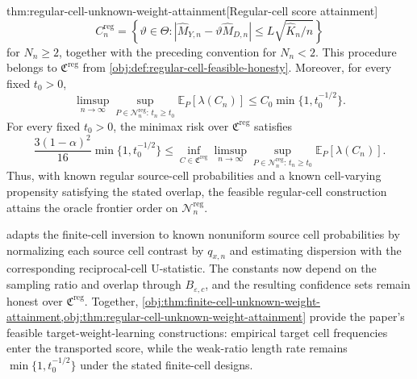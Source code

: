 \begin{theoremv}{thm:regular-cell-unknown-weight-attainment}[Regular-cell score attainment]
\[
C_n^{\mathrm{reg}}
=
\left\{\vartheta\in\Theta:
|\widehat M_{Y,n}-\vartheta\widehat M_{D,n}|
\le L\sqrt{\widehat K_n/n}\right\}
\]
for \(N_n\ge2\), together with the preceding convention for \(N_n<2\).  This procedure belongs to \(\mathfrak C^{\mathrm{reg}}\) from \cref{obj:def:regular-cell-feasible-honesty}.  Moreover, for every fixed \(t_0>0\),
\[
\limsup_{n\to\infty}\sup_{P\in\mathcal N_n^{\mathrm{reg}}:\,t_n\ge t_0}
\mathbb E_P[\lambda(C_n)]
\le
C_0\min\{1,t_0^{-1/2}\}.
\]
For every fixed \(t_0>0\), the minimax risk over \(\mathfrak C^{\mathrm{reg}}\) satisfies
\[
\frac{3(1-\alpha)^2}{16}\min\{1,t_0^{-1/2}\}
\le
\inf_{C\in\mathfrak C^{\mathrm{reg}}}
\limsup_{n\to\infty}\sup_{P\in\mathcal N_n^{\mathrm{reg}}:\,t_n\ge t_0}
\mathbb E_P[\lambda(C_n)].
\]
Thus, with known regular source-cell probabilities and a known cell-varying propensity satisfying the stated overlap, the feasible regular-cell construction attains the oracle frontier order on \(\mathcal N_n^{\mathrm{reg}}\).
\end{theoremv}

 adapts the finite-cell inversion to known nonuniform source cell probabilities by normalizing each source cell contrast by \(q_{x,n}\) and estimating dispersion with the corresponding reciprocal-cell U-statistic. The constants now depend on the sampling ratio and overlap through \(B_{\varepsilon,c}\), and the resulting confidence sets remain honest over \(\mathfrak C^{\mathrm{reg}}\). Together, \cref{obj:thm:finite-cell-unknown-weight-attainment,obj:thm:regular-cell-unknown-weight-attainment} provide the paper's feasible target-weight-learning constructions: empirical target cell frequencies enter the transported score, while the weak-ratio length rate remains \(\min\{1,t_0^{-1/2}\}\) under the stated finite-cell designs.
